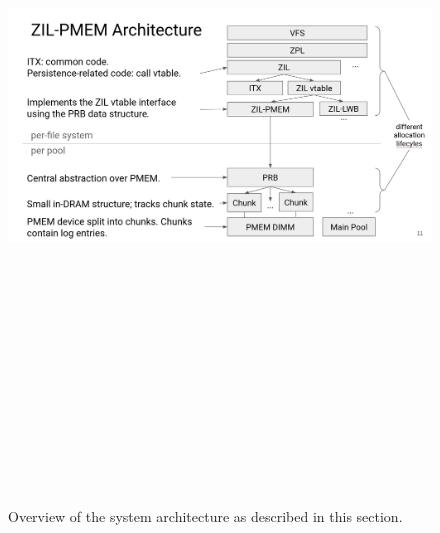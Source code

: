 \documentclass[12pt,a4paper,twoside]{book}
\begin{document}
\begin{figure}[h]
    \includegraphics[height=20cm,width=\textwidth,keepaspectratio]{fig/zilpmem_architecture_overview}
    \caption{Overview of the system architecture as described in this section.}
\end{figure}~
\end{document}
